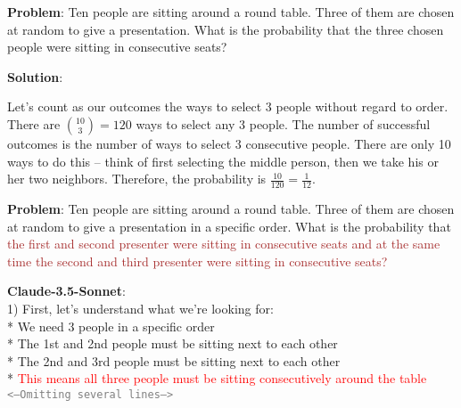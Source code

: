 \begin{figure*}[t]
\begin{small}
    \centering
    \begin{minipage}[c]{0.42\textwidth}
        \begin{tcolorbox}[colback=white, colframe=gray!30, title=\textcolor{black}{\textsf{Original}}]
        \textbf{Problem}: Ten people are sitting around a round table.  Three of them are chosen at random to give a presentation.  What is the probability that the three chosen people were sitting in consecutive seats?

        \dashline

        \textbf{Solution}:

        Let's count as our outcomes the ways to select 3 people without regard to order.  There are $\binom{10}{3} = 120$ ways to select any 3 people.  The number of successful outcomes is the number of ways to select 3 consecutive people.  There are only 10 ways to do this -- think of first selecting the middle person, then we take his or her two neighbors.  Therefore, the probability is $\frac{10}{120} = \boxed{\frac{1}{12}}$.
        \vspace{-1mm}
        \end{tcolorbox}

    \end{minipage}
    \hfill
    \begin{minipage}[c]{0.53\textwidth}
        \begin{tcolorbox}[colback=white, colframe=gray!30, title=\HARD]
            \textbf{Problem}: Ten people are sitting around a round table.  Three of them are chosen at random to give a presentation in a specific order.  What is the probability that \textcolor{brown}{the first and second presenter were sitting in consecutive seats and at the same time the second and third presenter were sitting in consecutive seats?}

            \dashline

            \textbf{Claude-3.5-Sonnet}: \\
            1) First, let's understand what we're looking for: \\
           * We need 3 people in a specific order \\
           * The 1st and 2nd people must be sitting next to each other \\
           * The 2nd and 3rd people must be sitting next to each other \\
           * \textcolor{red}{This means all three people must be sitting consecutively around the table} \\
    \textcolor{gray}{\texttt{<--Omitting several lines-->}}






\end{tcolorbox}
\end{minipage}
\end{small}
\end{figure*}

